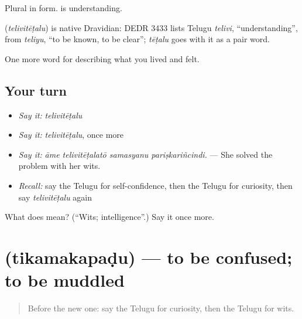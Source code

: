 Plural in form.  is understanding.

\begin{cousinweb}
\textbf{} (\emph{telivitēṭalu}) is native Dravidian: DEDR 3433 lists Telugu \emph{telivi}, \textquotedblleft{}understanding\textquotedblright{}, from \emph{teliyu}, \textquotedblleft{}to be known, to be clear\textquotedblright{}; \emph{tēṭalu} goes with it as a pair word.
\end{cousinweb}

\begin{grammarlens}[title={What you've built}]
One more word for describing what you lived and felt.
\end{grammarlens}

\subsection*{Your turn}
\begin{itemize}
\raggedright
  \item \emph{Say it:} \emph{telivitēṭalu}
  \item \emph{Say it:} \emph{telivitēṭalu}, once more
  \item \emph{Say it:} \emph{āme telivitēṭalatō samasyanu pariṣkariñcindi.} — She solved the problem with her wits.
  \item \emph{Recall:} say the Telugu for self-confidence, then the Telugu for curiosity, then say \emph{telivitēṭalu} again
\end{itemize}

\begin{tcolorbox}[breakable,colback=teal!4,colframe=teal!35!black,title={Before you move on}]
What does  mean? (\textquotedblleft{}Wits; intelligence\textquotedblright{}.) Say it once more.
\end{tcolorbox}
\section[\texorpdfstring{\te{తికమకపడు} (tikamakapaḍu)}{తికమకపడు (tikamakapaḍu)}]{ (tikamakapaḍu) — to be confused; to be muddled}

\label{lesson:TE-C511-tikamakapadu}



\begin{quote}
Before the new one: say the Telugu for curiosity, then the Telugu for wits.
\end{quote}

